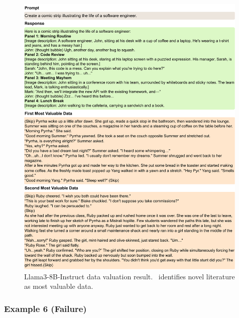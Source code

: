 \begin{figure}[htbp]
    \centering
    \includegraphics[width=0.99\textwidth]{figures/llama3_appendix5.pdf}
    \caption{Llama3-8B-Instruct data valuation result. \method\ identifies novel literature as most valuable data.}
\end{figure}

\clearpage
\subsubsection{Example 6 (Failure)}

